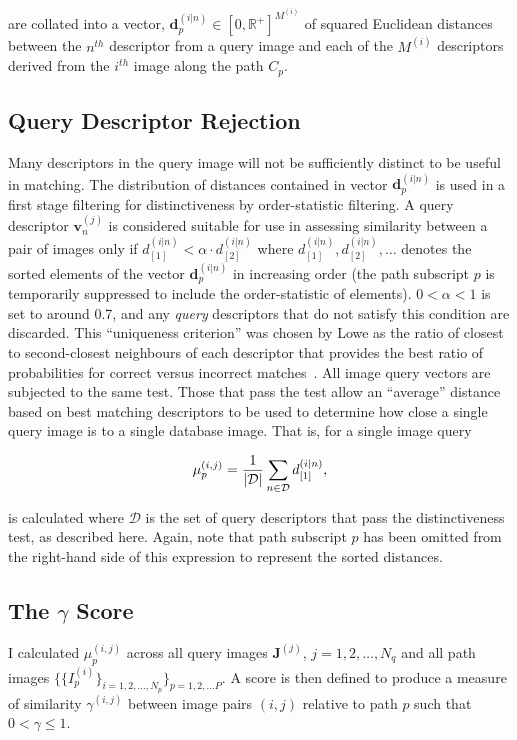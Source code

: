 are collated into a vector, $\mathbf{d}^{(i|n)}_p \in [0,\mathbb{R}^+]^{M^{(i)}}$ of squared Euclidean distances between the $n^{th}$ descriptor from a query image and each of the $M^{(i)}$ descriptors derived from the $i^{th}$ image along the path $C_p$. 

\subsection{Query Descriptor Rejection} \label{subsec:querydescrejection}
Many descriptors in the query image will not be sufficiently distinct to be useful in matching.  The distribution of distances contained in vector $\mathbf{d}^{(i|n)}_p$ is used in a first stage filtering for distinctiveness by order-statistic filtering.  A query descriptor $\mathbf{v}_n^{(j)}$ is considered suitable for use in assessing similarity between a pair of images only if $d^{(i|n)}_{[1]} < \alpha \cdot d^{(i|n)}_{[2]}$ where $d^{(i|n)}_{[1]}, d^{(i|n)}_{[2]},\ldots $ denotes the sorted elements of the vector $\mathbf{d}^{(i|n)}_p$ in increasing order (the path subscript $p$ is temporarily suppressed to include the order-statistic of elements).  $0<\alpha<1$ is set to around 0.7, and any \textit{query} descriptors that do not satisfy this condition are discarded. This ``uniqueness criterion'' was chosen by Lowe as the ratio of closest to second-closest neighbours of each descriptor that provides the best ratio of probabilities for correct versus incorrect matches~\cite{Lowe2004}. All image query vectors are subjected to the same test.  Those that pass the test allow an ``average'' distance based on best matching descriptors to be used to determine how close a single query image is to a single database image. That is, for a single image query 

\begin{equation}
\centering
\mu^{(i,j)}_p=\frac{1}{|\mathcal{D}|}\sum_{n\in \mathcal{D}} d^{(i|n)}_{[1]},
\end{equation}

is calculated where $\mathcal{D}$ is the set of query descriptors that pass the distinctiveness test, as described here. Again, note that path subscript $p$ has been omitted from the right-hand side of this expression to represent the sorted distances.

\subsection{The $\gamma$ Score} I calculated  $\mu_p^{(i,j)}$ across all query images $\mathbf{J}^{(j)}$, $j=1,2,\ldots,N_q$ and all path images $\lbrace\lbrace I^{(i)}_p\rbrace_{i=1,2,\ldots,N_p}\rbrace_{p=1,2,\ldots P}$.   A score is then defined to produce a measure of similarity $\gamma^{(i,j)}$ between image pairs $(i,j)$ relative to path $p$ such that $0 < \gamma \le 1$. 


